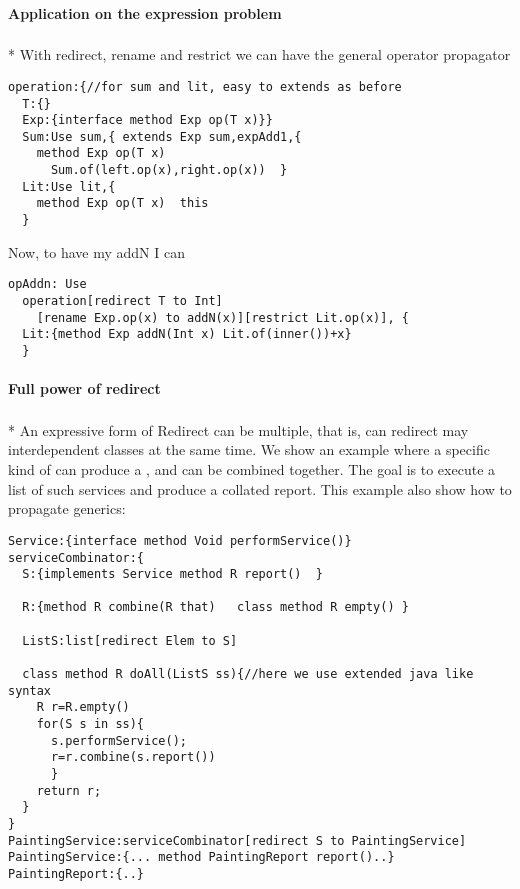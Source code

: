 



\paragraph{Application on the expression problem}${}_{}$\\*
With redirect, rename and restrict we can have the general operator propagator
\begin{lstlisting}
operation:{//for sum and lit, easy to extends as before
  T:{}
  Exp:{interface method Exp op(T x)}}
  Sum:Use sum,{ extends Exp sum,expAdd1,{
    method Exp op(T x)
      Sum.of(left.op(x),right.op(x))  }
  Lit:Use lit,{
    method Exp op(T x)  this
  }
\end{lstlisting}

Now, to have my addN I can

\begin{lstlisting}
opAddn: Use
  operation[redirect T to Int]
    [rename Exp.op(x) to addN(x)][restrict Lit.op(x)], {
  Lit:{method Exp addN(Int x) Lit.of(inner())+x}
  }
\end{lstlisting}  



\paragraph{Full power of redirect}${}_{}$\\*
An expressive form of Redirect can be multiple, that is, can redirect may interdependent classes at the same time.
We show an example where a specific kind of \Q@Service@ can produce a \Q@Report@, and 
\Q@Report@s can be combined together.
The goal is to execute a list of such services and produce a collated report.
This example also show how to propagate generics:

\begin{lstlisting}
Service:{interface method Void performService()}
serviceCombinator:{
  S:{implements Service method R report()  }
  
  R:{method R combine(R that)   class method R empty() }
  
  ListS:list[redirect Elem to S]
  
  class method R doAll(ListS ss){//here we use extended java like syntax
    R r=R.empty()
    for(S s in ss){
      s.performService();
      r=r.combine(s.report())
      }
    return r;
  }
}
PaintingService:serviceCombinator[redirect S to PaintingService]
PaintingService:{... method PaintingReport report()..}
PaintingReport:{..}
\end{lstlisting}

